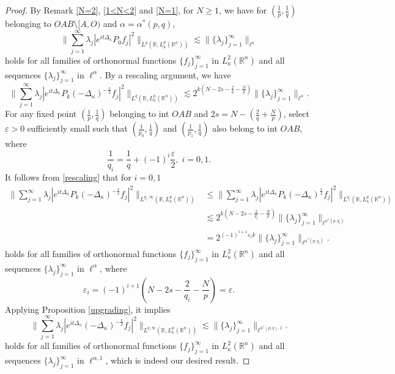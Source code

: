 \documentclass[a4paper,11pt, reqno]{amsart}
\numberwithin{equation}{section}
\theoremstyle{plain}
\theoremstyle{definition}
\theoremstyle{remark}
\begin{document}
\begin{proof}
By Remark \ref{N=2}, \ref{1<N<2} and \ref{N=1}, for $N\geq 1$, we have  for $(\frac{1}{p},\frac{1}{q})$ belonging to $OAB\setminus [A,O)$ and $\alpha=\alpha^*(p,q)$,
\begin{equation*}
			\bigg\|\sum_{j=1}^\infty \lambda_j|e^{it\Delta_\kappa}P_0f_j|^2\bigg\|_{L^{q}(\mathbb{R}, L_\kappa^p(\mathbb{R}^n))}\lesssim \|\{\lambda_j\}^\infty_{j=1}\|_{\ell^{\alpha}} 
\end{equation*}	
 holds for all families of orthonormal functions $\{f_j\}_{j=1}^\infty$ in $L_\kappa^2(\mathbb{R}^n)$ and all sequences $\{\lambda_j\}^\infty_{j=1}$ in $\ell^{\alpha}$. By a rescaling argument, we have
 \begin{equation}\label{rescaling}
			\bigg\|\sum_{j=1}^\infty \lambda_j|e^{it\Delta_\kappa}P_k(-\Delta_\kappa)^{-\frac{s}{2}}f_j|^2\bigg\|_{L^{q}(\mathbb{R}, L_\kappa^p(\mathbb{R}^n))}\lesssim 2^{k(N-2s-\frac{2}{q}-\frac{N}{p})}\|\{\lambda_j\}^\infty_{j=1}\|_{\ell^{\alpha}}.
\end{equation}	
For any fixed point $(\frac{1}{p},\frac{1}{q})$ belonging to int $OAB$ and $2s=N-\left(\frac{2}{q}+\frac{N}{p}\right)$, select $\varepsilon>0$ sufficiently small such that $(\frac{1}{p_0},\frac{1}{q})$ and $(\frac{1}{p_1},\frac{1}{q})$ also belong to int $OAB$, where 
\begin{equation*}
    \frac{1}{q_i}=\frac{1}{q}+(-1)^i\frac{\varepsilon}{2}, \;i=0,1.
\end{equation*}
It follows from \eqref{rescaling} that for $i=0,1$
\begin{align*}
			\bigg\|\sum_{j=1}^\infty \lambda_j|e^{it\Delta_\kappa}P_k(-\Delta_\kappa)^{-\frac{s}{2}}f_j|^2\bigg\|_{L^{q_i,\infty}(\mathbb{R}, L_\kappa^p(\mathbb{R}^n))}&\leq \bigg\|\sum_{j=1}^\infty \lambda_j|e^{it\Delta_\kappa}P_k(-\Delta_\kappa)^\frac{s}{2}f_j|^2\bigg\|_{L^{q_i}(\mathbb{R}, L_\kappa^p(\mathbb{R}^n))}\\
   &\lesssim 2^{k(N-2s-\frac{2}{q_i}-\frac{N}{p})}\|\{\lambda_j\}^\infty_{j=1}\|_{\ell^{\alpha^*(p,q_i)}}\\
   &= 2^{(-1)^{i+1}\varepsilon_ik}\|\{\lambda_j\}^\infty_{j=1}\|_{\ell^{\alpha^*(p,q_i)}}.
\end{align*}	
 holds for all families of orthonormal functions $\{f_j\}_{j=1}^\infty$ in $L_\kappa^2(\mathbb{R}^n)$ and all sequences $\{\lambda_j\}^\infty_{j=1}$ in $\ell^{\alpha}$, where 
 $$\varepsilon_i=(-1)^{i+1}(N-2s-\frac{2}{q_i}-\frac{N}{p})=\varepsilon.$$
Applying Proposition \ref{upgrading}, it implies
\begin{equation*}
			\bigg\|\sum_{j=1}^\infty \lambda_j|e^{it\Delta_\kappa}(-\Delta_\kappa)^{-\frac{s}{2}}f_j|^2\bigg\|_{L^{q,\infty}(\mathbb{R}, L_\kappa^p(\mathbb{R}^n))}\lesssim \|\{\lambda_j\}^\infty_{j=1}\|_{\ell^{\alpha^*(p,q),1}}.
\end{equation*}	
holds for all families of orthonormal functions $\{f_j\}_{j=1}^\infty$ in $L_\kappa^2(\mathbb{R}^n)$ and all sequences $\{\lambda_j\}^\infty_{j=1}$ in $\ell^{\alpha,1}$, which is indeed our desired result.
\end{proof}
\end{document}
